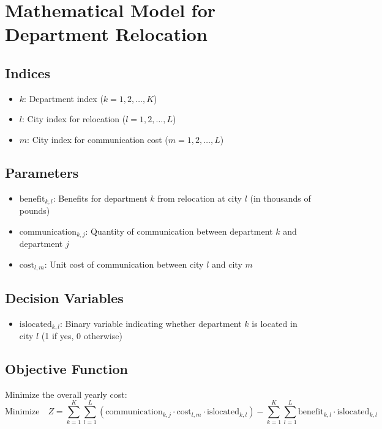 \documentclass{article}
\begin{document}
\section*{Mathematical Model for Department Relocation}

\subsection*{Indices}
\begin{itemize}
    \item \( k \): Department index (\( k = 1, 2, \ldots, K \))
    \item \( l \): City index for relocation (\( l = 1, 2, \ldots, L \))
    \item \( m \): City index for communication cost (\( m = 1, 2, \ldots, L \))
\end{itemize}

\subsection*{Parameters}
\begin{itemize}
    \item \( \text{benefit}_{k, l} \): Benefits for department \( k \) from relocation at city \( l \) (in thousands of pounds)
    \item \( \text{communication}_{k, j} \): Quantity of communication between department \( k \) and department \( j \)
    \item \( \text{cost}_{l, m} \): Unit cost of communication between city \( l \) and city \( m \)
\end{itemize}

\subsection*{Decision Variables}
\begin{itemize}
    \item \( \text{islocated}_{k, l} \): Binary variable indicating whether department \( k \) is located in city \( l \) (1 if yes, 0 otherwise)
\end{itemize}

\subsection*{Objective Function}
Minimize the overall yearly cost:
\[
\text{Minimize} \quad Z = \sum_{k=1}^K \sum_{l=1}^L \left( \text{communication}_{k, j} \cdot \text{cost}_{l, m} \cdot \text{islocated}_{k, l} \right) - \sum_{k=1}^K \sum_{l=1}^L \text{benefit}_{k, l} \cdot \text{islocated}_{k, l}
\]
\end{document}
